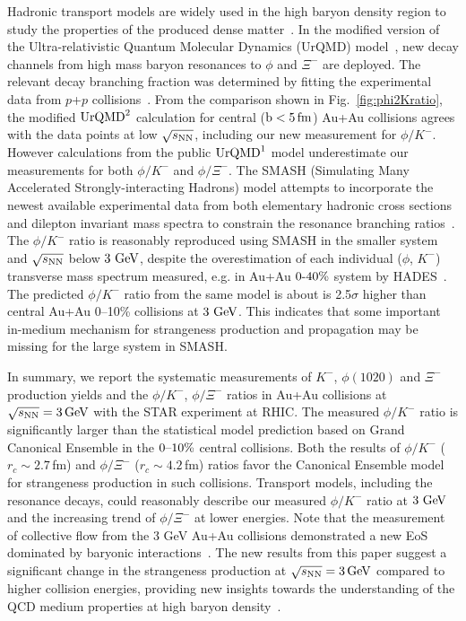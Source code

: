 \documentclass[%
 reprint,	
showpacs,
 amsmath,amssymb,
 aps,
 superscriptaddress,
]{revtex4-1}
\begin{document}
Hadronic transport models are widely used in the high baryon density region to study the properties of the produced dense matter~\cite{urQMD,UrQMD_2,Steinheimer_2015_UrQMD,Elfner_SMASH,Hartnack:2011cn,Song:2020clw}. In the modified version of the Ultra-relativistic Quantum Molecular Dynamics (UrQMD) model~\cite{Steinheimer_2015_UrQMD}, new decay channels from high mass baryon resonances to $\phi$ and $\Xi^-$ are deployed. The relevant decay branching fraction was determined by fitting the experimental data from $p$+$p$ collisions~\cite{ANKE_phi}. From the comparison shown in Fig.~\ref{fig:phi2Kratio}, the modified $\textup{UrQMD}^{2}$ calculation for central ($\rm{b}<5\,\rm{fm}$) Au+Au collisions agrees with the data points at low ${\sqrt{s_{\rm NN}}}$, including our new measurement for $\phi/K^-$.
However calculations from the public $\textup{UrQMD}^{1}$ model underestimate our measurements for both $\phi/K^-$ and $\phi/\Xi^-$.   
The SMASH
(Simulating Many Accelerated Strongly-interacting Hadrons) model attempts to incorporate the newest available experimental data from both elementary hadronic cross sections and dilepton invariant mass spectra to constrain the resonance branching ratios~\cite{Elfner_SMASH}. The $\phi/K^-$ ratio is reasonably reproduced using SMASH in the smaller system and ${\sqrt{s_{\rm NN}}}$ below $\textup{3 GeV}$, despite the overestimation of each individual ($\phi$, $K^-$) transverse mass spectrum measured, e.g. in Au+Au $\textup{0-40\%}$ system by HADES~\cite{Elfner_SMASH,HADES_phi_AuAu}. The predicted $\phi/K^-$ ratio from the same model is about is 2.5$\sigma$ higher than central Au+Au 0--10\% collisions at $\textup{3 GeV}$. This indicates that some important in-medium mechanism for strangeness production and propagation may be missing for the large system in SMASH.


In summary, we report the systematic measurements of $K^-$, $\phi(1020)$ and $\Xi^{-}$ production yields and the $\phi/K^-$, $\phi/\Xi^-$ ratios in Au+Au collisions at ${\sqrt{s_{\rm NN}} = \rm{3\,GeV}}$ with the STAR experiment at RHIC. The measured $\phi/K^-$ ratio is significantly larger than the statistical model prediction based on Grand Canonical Ensemble in the $\textup{0--10\%}$ central collisions. Both the results of $\phi/K^-$ ($r_c \sim 2.7$\,fm) and $\phi/\Xi^-$ ($r_c \sim 4.2$\,fm) ratios favor the Canonical Ensemble model for strangeness production in such collisions. Transport models, including the resonance decays, could reasonably describe our measured $\phi/K^-$ ratio at $\textup{3 GeV}$ and the increasing trend of $\phi/\Xi^-$ at lower energies. 
Note that the measurement of collective flow from the 3 GeV Au+Au collisions demonstrated a new EoS dominated by baryonic interactions~\cite{STAR:2021yiu}. The new results from this paper suggest a significant change in the strangeness production at ${\sqrt{s_{\rm NN}} = \rm{3\,GeV}}$ compared to higher collision energies, providing new insights towards the understanding of the QCD medium properties at high baryon density~\cite{KO_sQM17}. 
\end{document}
